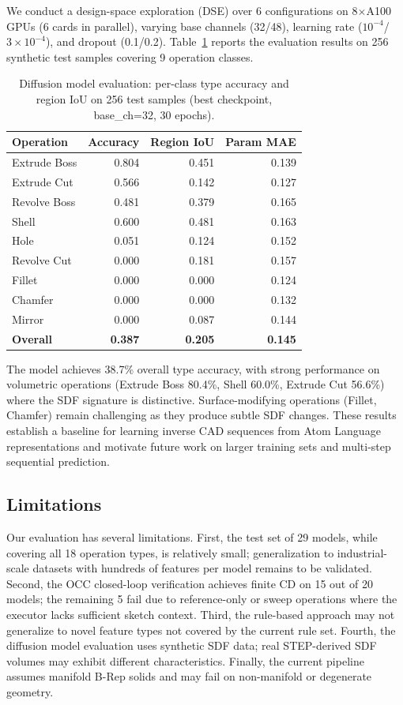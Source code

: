 \documentclass{styles/svproc}
\begin{document}
We conduct a design-space exploration (DSE) over 6 configurations on 8$\times$A100 GPUs (6 cards in parallel), varying base channels (32/48), learning rate ($10^{-4}$/$3\times10^{-4}$), and dropout (0.1/0.2). Table~\ref{tab:diffusion} reports the evaluation results on 256 synthetic test samples covering 9 operation classes.

\begin{table}[t]
\caption{Diffusion model evaluation: per-class type accuracy and region IoU on 256 test samples (best checkpoint, base\_ch=32, 30 epochs).}
\label{tab:diffusion}
\centering
\small
\begin{tabular}{lrrr}
\toprule
Operation & Accuracy & Region IoU & Param MAE \\
\midrule
Extrude Boss & 0.804 & 0.451 & 0.139 \\
Extrude Cut & 0.566 & 0.142 & 0.127 \\
Revolve Boss & 0.481 & 0.379 & 0.165 \\
Shell & 0.600 & 0.481 & 0.163 \\
Hole & 0.051 & 0.124 & 0.152 \\
Revolve Cut & 0.000 & 0.181 & 0.157 \\
Fillet & 0.000 & 0.000 & 0.124 \\
Chamfer & 0.000 & 0.000 & 0.132 \\
Mirror & 0.000 & 0.087 & 0.144 \\
\midrule
\textbf{Overall} & \textbf{0.387} & \textbf{0.205} & \textbf{0.145} \\
\bottomrule
\end{tabular}
\end{table}

The model achieves 38.7\% overall type accuracy, with strong performance on volumetric operations (Extrude Boss 80.4\%, Shell 60.0\%, Extrude Cut 56.6\%) where the SDF signature is distinctive. Surface-modifying operations (Fillet, Chamfer) remain challenging as they produce subtle SDF changes. These results establish a baseline for learning inverse CAD sequences from Atom Language representations and motivate future work on larger training sets and multi-step sequential prediction.

\subsection{Limitations}

Our evaluation has several limitations. First, the test set of 29 models, while covering all 18 operation types, is relatively small; generalization to industrial-scale datasets with hundreds of features per model remains to be validated. Second, the OCC closed-loop verification achieves finite CD on 15 out of 20 models; the remaining 5 fail due to reference-only or sweep operations where the executor lacks sufficient sketch context. Third, the rule-based approach may not generalize to novel feature types not covered by the current rule set. Fourth, the diffusion model evaluation uses synthetic SDF data; real STEP-derived SDF volumes may exhibit different characteristics. Finally, the current pipeline assumes manifold B-Rep solids and may fail on non-manifold or degenerate geometry.
\end{document}

